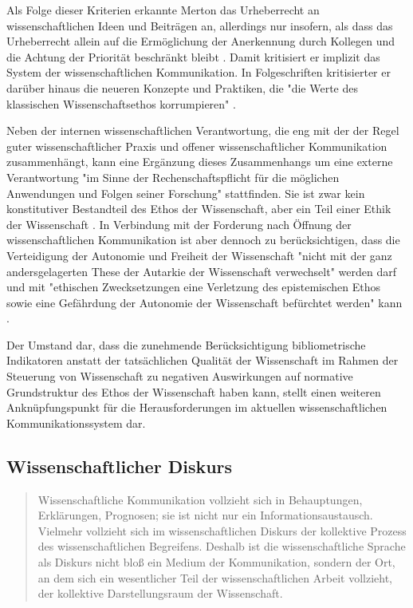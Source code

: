 Als Folge dieser Kriterien erkannte Merton das Urheberrecht an wissenschaftlichen Ideen und Beiträgen an, allerdings nur insofern, als dass das Urheberrecht allein auf die Ermöglichung der Anerkennung durch Kollegen und die Achtung der Priorität beschränkt bleibt \cite{Fangerau_2014}. Damit kritisiert er implizit das System der wissenschaftlichen Kommunikation. In Folgeschriften kritisierter er darüber hinaus die neueren Konzepte und Praktiken, die "die Werte des klassischen Wissenschaftsethos korrumpieren" \cite{Fröhlich_oa_2009}.

Neben der internen wissenschaftlichen Verantwortung, die eng mit der der Regel guter wissenschaftlicher Praxis und offener wissenschaftlicher Kommunikation zusammenhängt, kann eine Ergänzung dieses Zusammenhangs um eine externe Verantwortung "im Sinne der Rechenschaftspflicht für die möglichen Anwendungen und Folgen seiner Forschung" \cite{Oezmen_2015} stattfinden. Sie ist zwar kein konstitutiver Bestandteil des Ethos der Wissenschaft, aber ein Teil einer Ethik der Wissenschaft \cite{Oezmen_2015}. In Verbindung mit der Forderung nach Öffnung der wissenschaftlichen Kommunikation ist aber dennoch zu berücksichtigen, dass die Verteidigung der Autonomie und Freiheit der Wissenschaft "nicht mit der ganz andersgelagerten These der Autarkie der Wissenschaft verwechselt" werden darf und mit "ethischen Zwecksetzungen eine Verletzung des epistemischen Ethos sowie eine Gefährdung der Autonomie der Wissenschaft befürchtet werden" kann \cite{Oezmen_2015}.

Der Umstand dar, dass die zunehmende Berücksichtigung bibliometrische Indikatoren anstatt der tatsächlichen Qualität der Wissenschaft im Rahmen der Steuerung von Wissenschaft zu negativen Auswirkungen auf normative Grundstruktur des Ethos der Wissenschaft haben kann, stellt einen weiteren Anknüpfungspunkt für die Herausforderungen im aktuellen wissenschaftlichen Kommunikationssystem dar.

\subsection{Wissenschaftlicher Diskurs}

\begin{quote}Wissenschaftliche Kommunikation vollzieht sich in Behauptungen, Erklärungen, Prognosen; sie ist nicht nur ein Informationsaustausch. Vielmehr vollzieht sich im wissenschaftlichen Diskurs der kollektive Prozess des wissenschaftlichen Begreifens. Deshalb ist die wissenschaftliche Sprache als Diskurs nicht bloß ein Medium der Kommunikation, sondern der Ort, an dem sich ein wesentlicher Teil der wissenschaftlichen Arbeit vollzieht, der kollektive Darstellungsraum der Wissenschaft. \cite{bohme_1978_wissenschaftssprachen}\end{quote}

